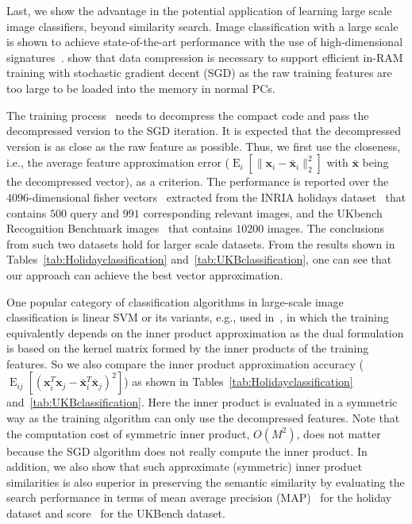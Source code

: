\documentclass[10pt, letterpaper]{article}
\begin{document}
Last,
we show the advantage
in the potential application
of learning large scale image classifiers,
beyond similarity search.
Image classification
with a large scale
is shown to
achieve state-of-the-art performance
with the use of high-dimensional signatures~\cite{PerronninAHS12,SanchezP11}.
\cite{PerronninAHS12,SanchezP11} show
that data compression is necessary
to support efficient in-RAM training
with stochastic gradient decent (SGD)
as the raw training features
are too large to be loaded into the memory
in normal PCs.

The training process~\cite{PerronninAHS12,SanchezP11}
needs to decompress
the compact code and pass the decompressed version
to the SGD iteration.
It is expected
that the decompressed version is as close as the raw feature as possible.
Thus, we first use the closeness,
i.e., the average feature approximation error
($\operatorname{E}_i[\|\mathbf{x}_i - \bar{\mathbf{x}}_i\|_2^2]$
with $\bar{\mathbf{x}}$ being the decompressed vector),
as a criterion.
The performance is reported
over the $4096$-dimensional fisher vectors~\cite{SanchezP11}
extracted from
the INRIA holidays dataset~\cite{JegouDS08}
that contains $500$ query and $991$ corresponding relevant images,
and the UKbench Recognition Benchmark images~\cite{NisterS06}
that contains $10200$ images.
The conclusions from such two datasets
hold for larger scale datasets.
From the results shown in Tables~\ref{tab:Holidayclassification} and~\ref{tab:UKBclassification},
one can see that
our approach can achieve the best vector approximation.


One popular category of classification algorithms in
large-scale image classification is linear SVM or its variants,
e.g., used in~\cite{PerronninAHS12,SanchezP11}, in which the
training equivalently depends on the inner product
approximation as the dual formulation is based on the kernel
matrix formed by the inner products of the training features.
So we also compare the inner product approximation accuracy
($\operatorname{E}_{ij}[(\mathbf{x}_i^T\mathbf{x}_j -
\bar{\mathbf{x}}_i^T\bar{\mathbf{x}}_j)^2]$) as shown in
Tables~\ref{tab:Holidayclassification}
and~\ref{tab:UKBclassification}.
Here the inner product is
evaluated
in a symmetric way as the training algorithm can only
use the decompressed features. Note that the computation cost
of symmetric inner product, $O(M^2)$, does not matter because
the SGD algorithm does not really compute the inner product. In
addition, we also show that such approximate (symmetric) inner
product similarities is also superior in preserving the
semantic similarity by evaluating the search performance in
terms of mean average precision (MAP)~\cite{JegouDS08} for the
holiday dataset and
score~\cite{NisterS06}
for the UKBench
dataset.
\end{document}
